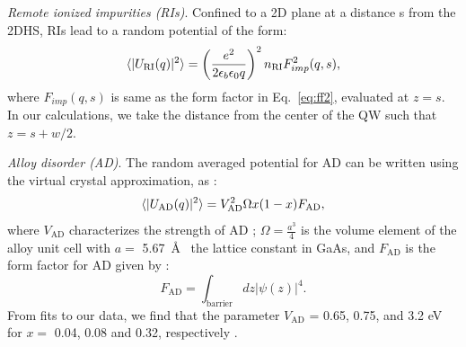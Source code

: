 \documentclass[reprint,amsmath,amssymb,aps,prl,nobibnotes,superscriptaddress]{revtex4-1}
\begin{document}
\textit{Remote ionized impurities (RIs)}. Confined to a 2D plane at a distance s from the 2DHS, RIs lead to a random potential of the form:
\begin{equation}
\braket{|U_{\textrm{RI}}(q)|^2}=\left(\frac{e^2}{2\epsilon_b\epsilon_0q}\right)^2n_\textrm{RI}F_{imp}^2(q,s),
\label{eq:RI}
\end{equation}
where $F_{imp}(q,s)$ is same as the form factor in Eq.~\ref{eq:ff2}, evaluated at $z=s$. In our calculations, we take the distance from the center of the QW such that $z=s+w/2$.

\textit{Alloy disorder (AD)}. The random averaged potential for AD can be written using the virtual crystal approximation, as \cite{Ando1982}:
\begin{equation}
\braket{|U_\textrm{AD}(q)|^2}=V_\textrm{AD}^2\Omega x(1-x)F_\textrm{AD},
\label{eq:AD}
\end{equation}
 where $V_\textrm{AD}$ characterizes the strength of AD \cite{Gold1989}; $\Omega= \frac{a^3}{4}$ is the volume element of the alloy unit cell with $a=$ 5.67~\AA~ the lattice constant in GaAs, and $F_\textrm{AD}$ is the form factor for AD given by \cite{Ando1982}:
\begin{equation}
F_\textrm{AD}=\int_{\textrm{barrier}}dz|\psi(z)|^4.
\label{eq:ffAD}
\end{equation}
From fits to our data, we find that the parameter $V_\textrm{AD}$ = 0.65, 0.75, and 3.2 eV for $x=$ 0.04, 0.08 and 0.32, respectively \cite{Supp}. 
\end{document}
